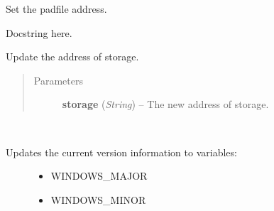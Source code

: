 \documentclass[letterpaper,10pt,english]{sphinxmanual}
\begin{document}

\begin{fulllineitems}
\label{diwavars:diwavars.update_padfile}
Set the padfile address.

\end{fulllineitems}


\begin{fulllineitems}
\label{diwavars:diwavars.update_responsive}
Docstring here.

\end{fulllineitems}


\begin{fulllineitems}
\label{diwavars:diwavars.update_storage}
Update the address of storage.
\begin{quote}\begin{description}
\item[{Parameters}] \leavevmode
\textbf{storage} (\emph{String}) -- The new address of storage.

\end{description}\end{quote}

\end{fulllineitems}


\begin{fulllineitems}
\label{diwavars:diwavars.update_windows_version}~\begin{description}
\item[{Updates the current version information to variables:}] \leavevmode\begin{itemize}
\item {} 
WINDOWS\_MAJOR

\item {} 
WINDOWS\_MINOR

\end{itemize}

\end{description}

\end{fulllineitems}
\end{document}
